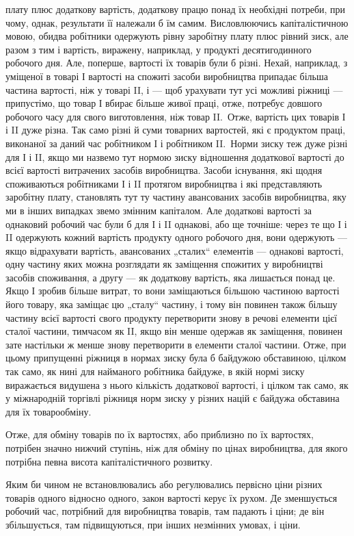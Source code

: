 \parcont{}  %
плату плюс додаткову вартість, додаткову працю понад їх необхідні
потреби, при чому, однак, результати її належали б їм
самим. Висловлюючись капіталістичною мовою, обидва робітники
одержують рівну заробітну плату плюс рівний зиск, але разом
з тим і вартість, виражену, наприклад, у продукті десятигодинного
робочого дня. Але, поперше, вартості їх товарів були б
різні. Нехай, наприклад, з уміщеної в товарі І вартості на спожиті
засоби виробництва припадає більша частина вартості, ніж у товарі
II, і — щоб урахувати тут усі можливі ріжниці — припустімо,
що товар І вбирає більше живої праці, отже, потребує довшого
робочого часу для свого виготовлення, ніж товар II.~Отже, вартість
цих товарів І і II дуже різна. Так само різні й суми товарних вартостей,
які є продуктом праці, виконаної за даний час робітником
І і робітником II.~Норми зиску теж дуже різні для І і II,
якщо ми назвемо тут нормою зиску відношення додаткової вартості
до всієї вартості витрачених засобів виробництва. Засоби
існування, які щодня споживаються робітниками І і II протягом
виробництва і які представляють заробітну плату, становлять
тут ту частину авансованих засобів виробництва, яку ми в інших
випадках звемо змінним капіталом. Але додаткові вартості за
однаковий робочий час були б для І і II однакові, або ще точніше:
через те що І і II одержують кожний вартість продукту
одного робочого дня, вони одержують — якщо відрахувати вартість,
авансованих „сталих“ елементів — однакові вартості, одну
частину яких можна розглядати як заміщення спожитих у виробництві
засобів споживання, а другу — як додаткову вартість,
яка лишається понад це. Якщо І зробив більше витрат, то вони
заміщаються більшою частиною вартості його товару, яка заміщає
цю „сталу“ частину, і тому він повинен також більшу
частину всієї вартості свого продукту перетворити знову в речові
елементи цієї сталої частини, тимчасом як II, якщо він
менше одержав як заміщення, повинен зате настільки ж менше
знову перетворити в елементи сталої частини. Отже, при цьому
припущенні ріжниця в нормах зиску була б байдужою обставиною,
цілком так само, як нині для найманого робітника байдуже,
в якій нормі зиску виражається видушена з нього кількість
додаткової вартості, і цілком так само, як у міжнародній торгівлі
ріжниця норм зиску у різних націй є байдужа обставина
для їх товарообміну.

Отже, для обміну товарів по їх вартостях, або приблизно
по їх вартостях, потрібен значно нижчий ступінь, ніж для обміну
по цінах виробництва, для якого потрібна певна висота капіталістичного
розвитку.

Яким би чином не встановлювались або регулювались первісно
ціни різних товарів одного відносно одного, закон вартості
керує їх рухом. Де зменшується робочий час, потрібний для
виробництва товарів, там падають і ціни; де він збільшується,
там підвищуються, при інших незмінних умовах, і ціни.
